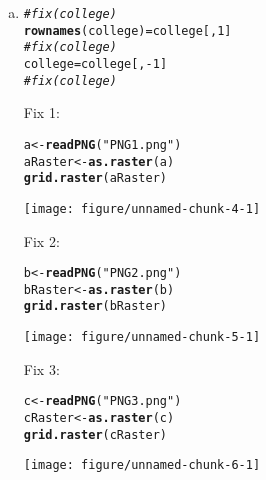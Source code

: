 \documentclass{article}\usepackage[]{graphicx}\usepackage[]{color}
\makeatletter
\def\maxwidth{ %
  \ifdim\Gin@nat@width>\linewidth
    \linewidth
  \else
    \Gin@nat@width
  \fi
}
\newcommand{\hlnum}[1]{\textcolor[rgb]{0.686,0.059,0.569}{#1}}%
\newcommand{\hlstr}[1]{\textcolor[rgb]{0.192,0.494,0.8}{#1}}%
\newcommand{\hlcom}[1]{\textcolor[rgb]{0.678,0.584,0.686}{\textit{#1}}}%
\newcommand{\hlopt}[1]{\textcolor[rgb]{0,0,0}{#1}}%
\newcommand{\hlstd}[1]{\textcolor[rgb]{0.345,0.345,0.345}{#1}}%
\newcommand{\hlkwb}[1]{\textcolor[rgb]{0.69,0.353,0.396}{#1}}%
\newcommand{\hlkwd}[1]{\textcolor[rgb]{0.737,0.353,0.396}{\textbf{#1}}}%
\newenvironment{kframe}{%
 \def\at@end@of@kframe{}%
 \ifinner\ifhmode%
  \def\at@end@of@kframe{\end{minipage}}%
  \begin{minipage}{\columnwidth}%
 \fi\fi%
 \def\FrameCommand##1{\hskip\@totalleftmargin \hskip-\fboxsep
 \colorbox{shadecolor}{##1}\hskip-\fboxsep
     \hskip-\linewidth \hskip-\@totalleftmargin \hskip\columnwidth}%
 \MakeFramed {\advance\hsize-\width
   \@totalleftmargin\z@ \linewidth\hsize
   \@setminipage}}%
 {\par\unskip\endMakeFramed%
 \at@end@of@kframe}
\newenvironment{knitrout}{}{} %
\makeatother
\begin{document}
\begin{enumerate}[(a)]
\begin{knitrout}
\begin{kframe}
\begin{verbatim}
\end{verbatim}
\end{kframe}
\end{knitrout}
\item
\begin{knitrout}
\color{fgcolor}\begin{kframe}
\begin{alltt}
\hlcom{#fix(college)}
\hlkwd{rownames}\hlstd{(college)}\hlkwb{=}\hlstd{college[,}\hlnum{1}\hlstd{]}
\hlcom{#fix(college)}
\hlstd{college}\hlkwb{=}\hlstd{college[,}\hlopt{-}\hlnum{1}\hlstd{]}
\hlcom{#fix(college)}
\end{alltt}
\end{kframe}
\end{knitrout}
Fix 1$:$ \\
\begin{knitrout}
\color{fgcolor}\begin{kframe}
\begin{alltt}
\hlstd{a}\hlkwb{<-}\hlkwd{readPNG}\hlstd{(}\hlstr{"PNG1.png"}\hlstd{)}
\hlstd{aRaster} \hlkwb{<-} \hlkwd{as.raster}\hlstd{(a)}
\hlkwd{grid.raster}\hlstd{(aRaster)}
\end{alltt}
\end{kframe}
\texttt{[image: figure/unnamed-chunk-4-1]} 

\end{knitrout}
Fix 2$:$ \\
\begin{knitrout}
\color{fgcolor}\begin{kframe}
\begin{alltt}
\hlstd{b}\hlkwb{<-}\hlkwd{readPNG}\hlstd{(}\hlstr{"PNG2.png"}\hlstd{)}
\hlstd{bRaster} \hlkwb{<-} \hlkwd{as.raster}\hlstd{(b)}
\hlkwd{grid.raster}\hlstd{(bRaster)}
\end{alltt}
\end{kframe}
\texttt{[image: figure/unnamed-chunk-5-1]} 

\end{knitrout}
Fix 3$:$ \\
\begin{knitrout}
\color{fgcolor}\begin{kframe}
\begin{alltt}
\hlstd{c}\hlkwb{<-}\hlkwd{readPNG}\hlstd{(}\hlstr{"PNG3.png"}\hlstd{)}
\hlstd{cRaster} \hlkwb{<-} \hlkwd{as.raster}\hlstd{(c)}
\hlkwd{grid.raster}\hlstd{(cRaster)}
\end{alltt}
\end{kframe}
\texttt{[image: figure/unnamed-chunk-6-1]} 


\end{knitrout}
\end{enumerate}
\end{document}
